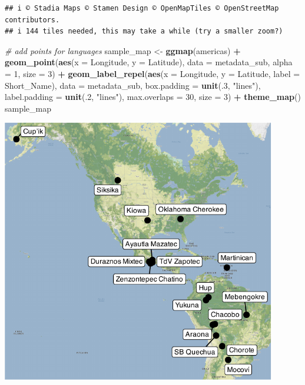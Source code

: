 \documentclass[
]{article}
\newenvironment{Shaded}{\begin{snugshade}}{\end{snugshade}}
\newcommand{\AttributeTok}[1]{\textcolor[rgb]{0.13,0.29,0.53}{#1}}
\newcommand{\CommentTok}[1]{\textcolor[rgb]{0.56,0.35,0.01}{\textit{#1}}}
\newcommand{\DecValTok}[1]{\textcolor[rgb]{0.00,0.00,0.81}{#1}}
\newcommand{\FunctionTok}[1]{\textcolor[rgb]{0.13,0.29,0.53}{\textbf{#1}}}
\newcommand{\NormalTok}[1]{#1}
\newcommand{\OtherTok}[1]{\textcolor[rgb]{0.56,0.35,0.01}{#1}}
\newcommand{\SpecialCharTok}[1]{\textcolor[rgb]{0.81,0.36,0.00}{\textbf{#1}}}
\newcommand{\StringTok}[1]{\textcolor[rgb]{0.31,0.60,0.02}{#1}}
\begin{document}
\begin{verbatim}
## i © Stadia Maps © Stamen Design © OpenMapTiles © OpenStreetMap contributors.
## i 144 tiles needed, this may take a while (try a smaller zoom?)
\end{verbatim}

\begin{Shaded}
\begin{Highlighting}[]
\CommentTok{\# add points for languages}
\NormalTok{sample\_map }\OtherTok{\textless{}{-}} \FunctionTok{ggmap}\NormalTok{(americas) }\SpecialCharTok{+}
  \FunctionTok{geom\_point}\NormalTok{(}\FunctionTok{aes}\NormalTok{(}\AttributeTok{x =}\NormalTok{ Longitude, }\AttributeTok{y =}\NormalTok{ Latitude), }\AttributeTok{data =}\NormalTok{ metadata\_sub, }\AttributeTok{alpha =} \DecValTok{1}\NormalTok{, }\AttributeTok{size =} \DecValTok{3}\NormalTok{) }\SpecialCharTok{+}
  \FunctionTok{geom\_label\_repel}\NormalTok{(}\FunctionTok{aes}\NormalTok{(}\AttributeTok{x =}\NormalTok{ Longitude, }\AttributeTok{y =}\NormalTok{ Latitude, }\AttributeTok{label =}\NormalTok{ Short\_Name), }\AttributeTok{data =}\NormalTok{ metadata\_sub, }\AttributeTok{box.padding =} \FunctionTok{unit}\NormalTok{(.}\DecValTok{3}\NormalTok{, }\StringTok{"lines"}\NormalTok{), }\AttributeTok{label.padding =} \FunctionTok{unit}\NormalTok{(.}\DecValTok{2}\NormalTok{, }\StringTok{"lines"}\NormalTok{), }\AttributeTok{max.overlaps =} \DecValTok{30}\NormalTok{, }\AttributeTok{size =} \DecValTok{3}\NormalTok{) }\SpecialCharTok{+}
  \FunctionTok{theme\_map}\NormalTok{()}
\NormalTok{sample\_map}
\end{Highlighting}
\end{Shaded}

\begin{center}\includegraphics[width=0.9\textwidth,height=\textheight]{02_analyses_chapter17_files/figure-latex/map prep-1} \end{center}
\end{document}
